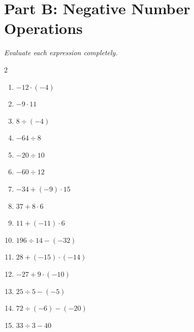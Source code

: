 \documentclass[11pt]{article}
\begin{document}
\section*{Part B: Negative Number Operations}
\noindent\textit{Evaluate each expression completely.}
\begin{multicols}{2}
\begin{enumerate}
  \item $-12 \cdot (-4)$
  \vspace{1.2cm}
  \item $-9 \cdot 11$
  \vspace{1.2cm}
  \item $8 \div (-4)$
  \vspace{1.2cm}
  \item $-64 \div 8$
  \vspace{1.2cm}
  \item $-20 \div 10$
  \vspace{1.2cm}
  \item $-60 \div 12$
  \vspace{1.2cm}
  \item $-34 + (-9) \cdot 15$
  \vspace{1.2cm}
  \item $37 + 8 \cdot 6$
  \vspace{1.2cm}
  \item $11 + (-11) \cdot 6$
  \vspace{1.2cm}
  \item $196 \div 14 - (-32)$
  \vspace{1.2cm}
  \item $28 + (-15) \cdot (-14)$
  \vspace{1.2cm}
  \item $-27 + 9 \cdot (-10)$
  \vspace{1.2cm}
  \item $25 \div 5 - (-5)$
  \vspace{1.2cm}
  \item $72 \div (-6) - (-20)$
  \vspace{1.2cm}
  \item $33 \div 3 - 40$
  \vspace{1.2cm}
\end{enumerate}
\end{multicols}
\end{document}
